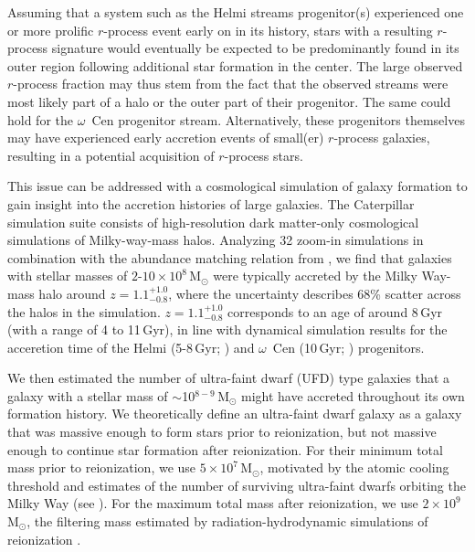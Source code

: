 \documentclass[twocolumn]{aastex63}
\begin{document}
Assuming that a system such as the Helmi streams progenitor(s) experienced one or more prolific $r$-process event early on in its history, stars with a resulting $r$-process signature would eventually be expected to be predominantly found in its outer region following additional star formation in the center. The large observed $r$-process fraction may thus stem from the fact that the observed streams were most likely part of a halo or the outer part of their progenitor. The same could hold for the $\omega$~Cen progenitor stream. Alternatively, these progenitors themselves may have experienced early accretion events of small(er) $r$-process galaxies, resulting in a potential acquisition of $r$-process stars.


This issue can be addressed with a cosmological simulation of galaxy formation to gain insight into the accretion histories of large galaxies. The Caterpillar simulation suite \citep{griffen16} consists of high-resolution dark matter-only cosmological simulations of Milky-way-mass halos. Analyzing 32 zoom-in simulations in combination with the abundance matching relation from \citet{Garrison_Kimmel17}, we find that galaxies with stellar masses of $2$-$10\times10^{8}$\,M$_{\odot}$ were typically accreted by the Milky Way-mass halo around $z = 1.1^{+1.0}_{-0.8}$, where the uncertainty describes 68\% scatter across the halos in the simulation. 
$z = 1.1^{+1.0}_{-0.8}$ corresponds to an age of around 8\,Gyr (with a range of 4 to 11\,Gyr), in line with dynamical simulation results for the acceretion time of the Helmi (5-8\,Gyr; \citealt{koppelman19}) and $\omega$~Cen (10\,Gyr; \citealt{bekki03}) progenitors. 


We then estimated the number of ultra-faint dwarf (UFD) type galaxies that a galaxy with a stellar mass of $\sim$10$^{8-9}$\,M$_{\odot}$ might have accreted throughout its own formation history. We theoretically define an ultra-faint dwarf galaxy as a galaxy that was massive enough to form stars prior to reionization, but not massive enough to continue star formation after reionization. For their minimum total mass prior to reionization, we use $5\times10^{7}$\,M$_{\odot}$, motivated by the atomic cooling threshold \citep{bromm_yoshida11} and estimates of the number of surviving ultra-faint dwarfs orbiting the Milky Way (see \citealt{brauer19}). For the maximum total mass after reionization, we use $2\times10^{9}$\,M$_{\odot}$, the filtering mass estimated by radiation-hydrodynamic simulations of reionization \citep{ocvirk16}. 
\end{document}

